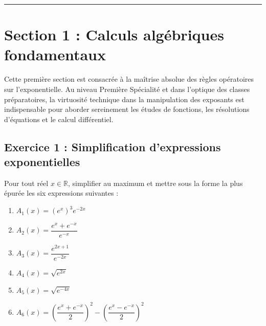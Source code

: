 \documentclass[11pt,a4paper]{article}
\newcommand{\R}{\mathbb{R}}
\begin{document}
\vspace{0.8cm}
\hrule
\vspace{0.8cm}
\section{Section 1 : Calculs algébriques fondamentaux}

Cette première section est consacrée à la maîtrise absolue des règles opératoires sur l'exponentielle. Au niveau Première Spécialité et dans l'optique des classes préparatoires, la virtuosité technique dans la manipulation des exposants est indispensable pour aborder sereinement les études de fonctions, les résolutions d'équations et le calcul différentiel.

\subsection*{Exercice 1 : Simplification d'expressions exponentielles}

Pour tout réel $x \in \R$, simplifier au maximum et mettre sous la forme la plus épurée les six expressions suivantes :
\begin{enumerate}[label=\textbf{\arabic*.}]
    \item $A_1(x) = (e^x)^3 e^{-2x}$
    \item $A_2(x) = \dfrac{e^x + e^{-x}}{e^{-x}}$
    \item $A_3(x) = \dfrac{e^{2x+1}}{e^{-2x}}$
    \item $A_4(x) = \sqrt{e^{2x}}$
    \item $A_5(x) = \sqrt{e^{-4x}}$
    \item $A_6(x) = \left(\dfrac{e^x + e^{-x}}{2}\right)^2 - \left(\dfrac{e^x - e^{-x}}{2}\right)^2$
\end{enumerate}
\end{document}
